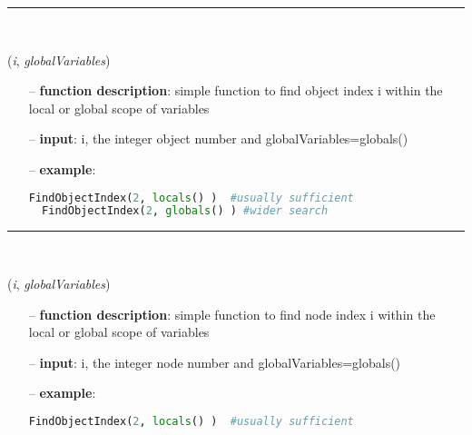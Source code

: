 \begin{itemize}[leftmargin=1.4cm]
%
\noindent\rule{8cm}{0.75pt}\vspace{1pt} \\ 
\begin{flushleft}
\label{sec:advancedUtilities:FindObjectIndex}
({\it i}, {\it globalVariables})
\end{flushleft}
\setlength{\itemindent}{0.7cm}
\begin{itemize}[leftmargin=0.7cm]
\item[--]
{\bf function description}: simple function to find object index i within the local or global scope of variables
\item[--]
{\bf input}: i, the integer object number and  globalVariables=globals()
\item[--]
{\bf example}: \vspace{-12pt}\ei\begin{lstlisting}[language=Python, xleftmargin=36pt]
  FindObjectIndex(2, locals() )  #usually sufficient
  FindObjectIndex(2, globals() ) #wider search
\end{lstlisting}\vspace{-24pt}\bi\item[]\vspace{-24pt}\vspace{12pt}\end{itemize}
%
\noindent\rule{8cm}{0.75pt}\vspace{1pt} \\ 
\begin{flushleft}
\label{sec:advancedUtilities:FindNodeIndex}
({\it i}, {\it globalVariables})
\end{flushleft}
\setlength{\itemindent}{0.7cm}
\begin{itemize}[leftmargin=0.7cm]
\item[--]
{\bf function description}: simple function to find node index i within the local or global scope of variables
\item[--]
{\bf input}: i, the integer node number and  globalVariables=globals()
\item[--]
{\bf example}: \vspace{-12pt}\ei\begin{lstlisting}[language=Python, xleftmargin=36pt]
  FindObjectIndex(2, locals() )  #usually sufficient

\end{lstlisting}
\end{itemize}
\end{itemize}
